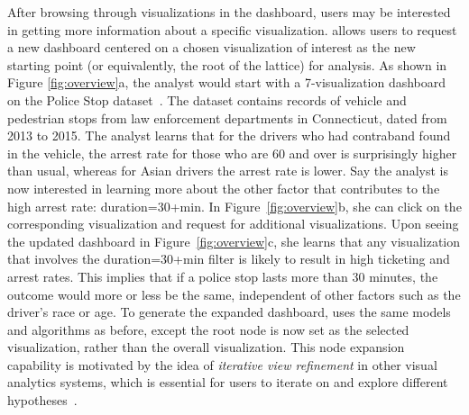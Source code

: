 \par After browsing through visualizations in the dashboard, users may be interested in getting more information about a specific visualization. \system allows users to request a new dashboard centered on a chosen visualization of interest as the new starting point (or equivalently, the root of the lattice) for analysis. As shown in Figure \ref{fig:overview}a, the analyst would start with a 7-visualization dashboard on the Police Stop dataset~\cite{police}. The dataset contains records of vehicle and pedestrian stops from law enforcement departments in Connecticut, dated from 2013 to 2015. The analyst learns that for the drivers who had contraband found in the vehicle, the arrest rate for those who are 60 and over is surprisingly higher than usual, whereas for Asian drivers the arrest rate is lower. Say the analyst is now interested in learning more about the other factor that contributes to the high arrest rate: duration=30+min. In Figure~\ref{fig:overview}b, she can click on the corresponding visualization and request for additional visualizations. Upon seeing the updated dashboard in Figure~\ref{fig:overview}c, she learns that any visualization that involves the duration=30+min filter is likely to result in high ticketing and arrest rates. This implies that if a police stop lasts more than 30 minutes, the outcome would more or less be the same, independent of other factors such as the driver's race or age. To generate the expanded dashboard, \system uses the same models and algorithms as before, except the root node is now set as the selected visualization, rather than the overall visualization. This node expansion capability is motivated by the idea of \textit{iterative view refinement} in other visual analytics systems, which is essential for users to iterate on and explore different hypotheses~\cite{Hoque2017,Wongsuphasawat2016}.

